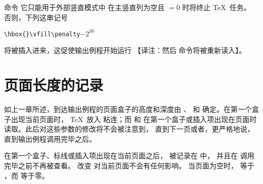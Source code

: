 \documentclass{book}
\begin{document}
 命令 \ldash 它只能用于外部竖直模式中 \rdash
在主竖直列为空且 ${}=0$ 时将终止 \TeX\ 任务。
否则，下列这串记号
\label{end:play}%
\begin{disp}\verb>\hbox{}\vfill\penalty>$-2^{30}$\end{disp}
将被插入进来，这促使输出例程开始运行
【译注：然后  命令将被重新读入】。

\section{页面长度的记录}


如上一章所述，到达输出例程的页面盒子的高度和深度由 、
 和  确定。在第一个盒子出现当前页面时，
\TeX\ 放入  粘连；而  和 
在第一个盒子或插入项出现在页面时读取。此后对这些参数的修改将不会被注意到，
直到下一页或者，更严格地说，直到输出例程调用完毕之后。

在第一个盒子、标线或插入项出现在当前页面之后，
 被记录在  中，
并且在  调用完毕之前不再被查看。
改变  对当前页面不会有任何影响。
当页面为空时， 等于 ，而  等于零。
\end{document}
